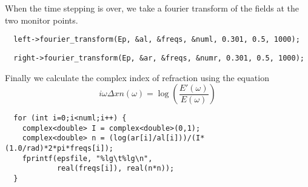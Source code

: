 \begin{comment}
    f.step();
  }
  FILE *epsfile = create_output_file(dirname, "eps");
  fprintf(epsfile, header);
  complex<double> *al, *ar, *freqs;
  int numl, numr;
  printf("Working on left fourier transform...\n");
\end{comment}
When the time stepping is over, we take a fourier transform of the fields
at the two monitor points.
\begin{verbatim}
  left->fourier_transform(Ep, &al, &freqs, &numl, 0.301, 0.5, 1000);
\end{verbatim}
\begin{comment}
  delete[] freqs;
  printf("Working on right fourier transform...\n");
\end{comment}
\begin{verbatim}
  right->fourier_transform(Ep, &ar, &freqs, &numr, 0.301, 0.5, 1000);
\end{verbatim}
\begin{comment}
  if (numl != numr) printf("Aaack you need both nums to be the same!\n");
  fprintf(epsfile, "@target G0.S0\n@type xy\n");
\end{comment}
Finally we calculate the complex index of refraction using the equation
\begin{equation*}
i \omega \Delta x n(\omega) = \log \left(\frac{E'(\omega)}{E(\omega)}\right)
\end{equation*}
\begin{verbatim}
  for (int i=0;i<numl;i++) {
    complex<double> I = complex<double>(0,1);
    complex<double> n = (log(ar[i]/al[i]))/(I*(1.0/rad)*2*pi*freqs[i]);
    fprintf(epsfile, "%lg\t%lg\n",
            real(freqs[i]), real(n*n));
  }
\end{verbatim}
\begin{comment}
  fprintf(epsfile, "@target G0.S1\n@type xy\n");
  for (int i=0;i<numl;i++) {
    complex<double> I = complex<double>(0,1);
    complex<double> n = (log(ar[i]/al[i]))/(I*(1.0/rad)*2*pi*freqs[i]);
    fprintf(epsfile, "%
            real(freqs[i]), imag(n*n));
  }
  fclose(epsfile);
  char gracecmd[500];
  snprintf(gracecmd, 500, "gracebat -hdevice EPS -printfile %
           dirname, dirname);
  system(gracecmd);
}
\end{comment}

